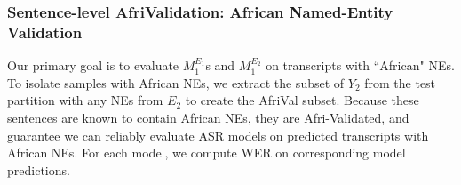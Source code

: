 \documentclass{INTERSPEECH2023}
\begin{document}




\subsubsection{Sentence-level AfriValidation: African Named-Entity Validation}\label{section:afriVal}
Our primary goal is to evaluate $M_{1}^{E_{1}}$s and $M_{1}^{E_{2}}$ on transcripts with ``African" NEs. To isolate samples with African NEs, we extract the subset of $Y_2$ from the test partition with any NEs from $E_2$ to create the AfriVal subset. Because these sentences are known to contain African NEs, they are Afri-Validated, and guarantee we can reliably evaluate ASR models on predicted transcripts with African NEs. For each model, we compute WER on corresponding model predictions. %

\end{document}
